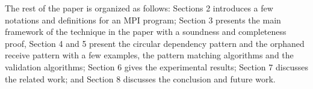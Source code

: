 The rest of the paper is organized as follows: Sections 2 introduces a few notations and definitions for an MPI program; Section 3 presents the main framework of the technique in the paper with a soundness and completeness proof, Section 4 and 5 present the circular dependency pattern and the orphaned receive pattern with a few examples, the pattern matching algorithms and the validation algorithms; Section 6 gives the experimental results; Section 7 discusses the related work; and Section 8 discusses the conclusion and future work.
